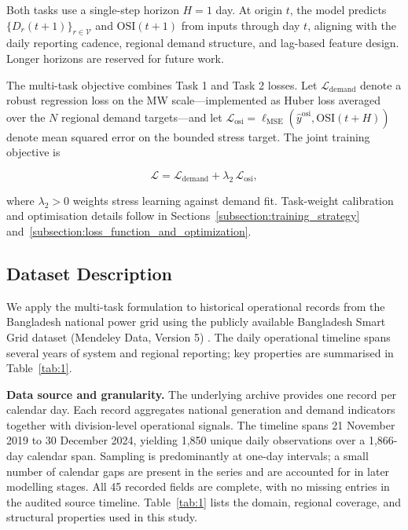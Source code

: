 Both tasks use a single-step horizon \(H = 1\) day. At origin \(t\), the model predicts \(\{D_r(t+1)\}_{r \in \mathcal{V}}\) and \(\mathrm{OSI}(t+1)\) from inputs through day \(t\), aligning with the daily reporting cadence, regional demand structure, and lag-based feature design. Longer horizons are reserved for future work.

The multi-task objective combines Task 1 and Task 2 losses. Let \(\mathcal{L}_{\mathrm{demand}}\) denote a robust regression loss on the MW scale---implemented as Huber loss \cite{Huber1964RobustEstimation} averaged over the \(N\) regional demand targets---and let \(\mathcal{L}_{\mathrm{osi}} = \ell_{\mathrm{MSE}}(\hat{y}^{\mathrm{osi}}, \mathrm{OSI}(t+H))\) denote mean squared error on the bounded stress target. The joint training objective is

\[
\mathcal{L} = \mathcal{L}_{\mathrm{demand}} + \lambda_2 \, \mathcal{L}_{\mathrm{osi}},
\]

where \(\lambda_2 > 0\) weights stress learning against demand fit. Task-weight calibration and optimisation details follow in Sections~\ref{subsection:training_strategy} and~\ref{subsection:loss_function_and_optimization}.

\subsection{Dataset Description}\label{subsection:dataset_description}

We apply the multi-task formulation to historical operational records from the Bangladesh national power grid using the publicly available Bangladesh Smart Grid dataset (Mendeley Data, Version 5) \cite{Hossain2025BangladeshSmartGrid}. The daily operational timeline spans several years of system and regional reporting; key properties are summarised in Table~\ref{tab:1}.

\textbf{Data source and granularity.} The underlying archive provides one record per calendar day. Each record aggregates national generation and demand indicators together with division-level operational signals. The timeline spans 21 November 2019 to 30 December 2024, yielding 1,850 unique daily observations over a 1,866-day calendar span. Sampling is predominantly at one-day intervals; a small number of calendar gaps are present in the series and are accounted for in later modelling stages. All 45 recorded fields are complete, with no missing entries in the audited source timeline. Table~\ref{tab:1} lists the domain, regional coverage, and structural properties used in this study.

